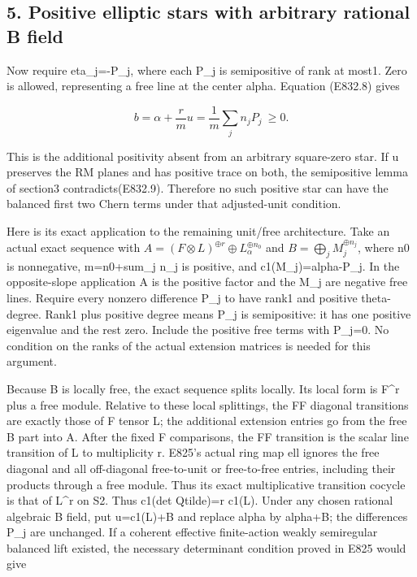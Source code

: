 \subsection{5. Positive elliptic stars with arbitrary rational B
field}\label{SF-E832:positive-elliptic-stars-with-arbitrary-rational-b-field}

Now require eta\_j=-P\_j, where each P\_j is semipositive of rank at
most1. Zero is allowed, representing a free line at the center alpha.
Equation (E832.8) gives

\[
 b=\alpha+\frac r m u=\frac1m\sum_j n_jP_j\ \ge0.
 \tag{E832.10}
\]

This is the additional positivity absent from an arbitrary square-zero
star. If u preserves the RM planes and has positive trace on both, the
semipositive lemma of section3 contradicts(E832.9). Therefore no such
positive star can have the balanced first two Chern terms under that
adjusted-unit condition.

Here is its exact application to the remaining unit/free architecture.
Take an actual exact sequence with
\(A=(F\otimes L)^{\oplus r}\oplus L_\alpha^{\oplus n_0}\) and
\(B=\bigoplus_j M_j^{\oplus n_j}\), where n0 is nonnegative, m=n0+sum\_j
n\_j is positive, and c1(M\_j)=alpha-P\_j. In the opposite-slope
application A is the positive factor and the M\_j are negative free
lines. Require every nonzero difference P\_j to have rank1 and positive
theta-degree. Rank1 plus positive degree means P\_j is semipositive: it
has one positive eigenvalue and the rest zero. Include the positive free
terms with P\_j=0. No condition on the ranks of the actual extension
matrices is needed for this argument.

Because B is locally free, the exact sequence splits locally. Its local
form is F\^{}r plus a free module. Relative to these local splittings,
the FF diagonal transitions are exactly those of F tensor L; the
additional extension entries go from the free B part into A. After the
fixed F comparisons, the FF transition is the scalar line transition of
L to multiplicity r. E825's actual ring map ell ignores the free
diagonal and all off-diagonal free-to-unit or free-to-free entries,
including their products through a free module. Thus its exact
multiplicative transition cocycle is that of L\^{}r on S2. Thus c1(det
Qtilde)=r c1(L). Under any chosen rational algebraic B field, put
u=c1(L)+B and replace alpha by alpha+B; the differences P\_j are
unchanged. If a coherent effective finite-action weakly semiregular
balanced lift existed, the necessary determinant condition proved in
E825 would give

